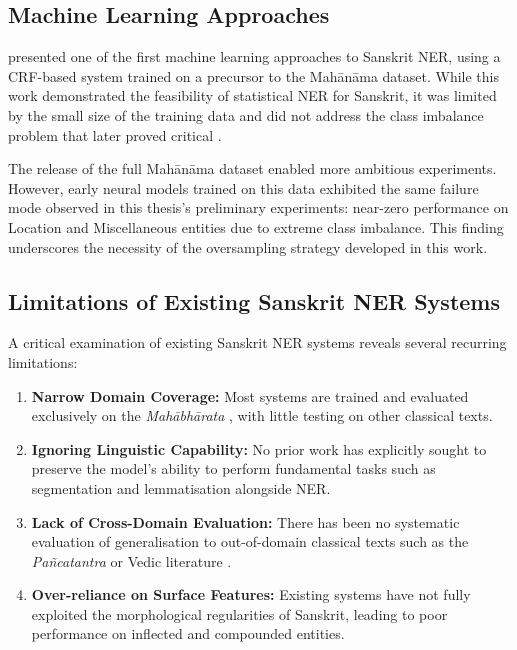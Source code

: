 \subsection{Machine Learning Approaches}
\label{subsec:ml_sanskrit_ner}

\citet{sarkar2023preannotation} presented one of the first machine learning approaches to Sanskrit NER, using a CRF-based system trained on a precursor to the Mahānāma dataset. While this work demonstrated the feasibility of statistical NER for Sanskrit, it was limited by the small size of the training data and did not address the class imbalance problem that later proved critical \cite{sarkar2025mahanama}.

The release of the full Mahānāma dataset \cite{sarkar2025mahanama} enabled more ambitious experiments. However, early neural models trained on this data exhibited the same failure mode observed in this thesis's preliminary experiments: near-zero performance on Location and Miscellaneous entities due to extreme class imbalance. This finding underscores the necessity of the oversampling strategy developed in this work.

\subsection{Limitations of Existing Sanskrit NER Systems}
\label{subsec:limitations_existing}

A critical examination of existing Sanskrit NER systems reveals several recurring limitations:

\begin{enumerate}
    \item \textbf{Narrow Domain Coverage:} Most systems are trained and evaluated exclusively on the \textit{Mahābhārata} \cite{mahabharata}, with little testing on other classical texts.
    \item \textbf{Ignoring Linguistic Capability:} No prior work has explicitly sought to preserve the model's ability to perform fundamental tasks such as segmentation and lemmatisation alongside NER.
    \item \textbf{Lack of Cross-Domain Evaluation:} There has been no systematic evaluation of generalisation to out-of-domain classical texts such as the \textit{Pañcatantra} \cite{pancatantra_text} or Vedic literature \cite{rigveda}.
    \item \textbf{Over-reliance on Surface Features:} Existing systems have not fully exploited the morphological regularities of Sanskrit, leading to poor performance on inflected and compounded entities.
\end{enumerate}

